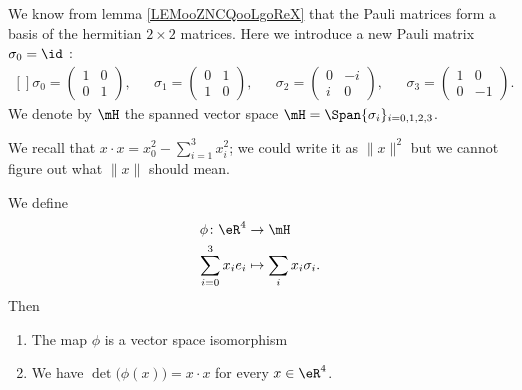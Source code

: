 We know from lemma \ref{LEMooZNCQooLgoReX} that the Pauli matrices form a basis of the hermitian \( 2\times 2\) matrices. Here we introduce a new Pauli matrix \( \sigma_0=\id\) :
\begin{equation}
	\begin{aligned}[]
		\sigma_0=\begin{pmatrix}
			         1 & 0 \\
			         0 & 1
		         \end{pmatrix}, &  &
		\sigma_1=\begin{pmatrix}
			         0 & 1 \\
			         1 & 0
		         \end{pmatrix}, &  &
		\sigma_2=\begin{pmatrix}
			         0 & -i \\
			         i & 0
		         \end{pmatrix}, &  &
		\sigma_3=\begin{pmatrix}
			         1 & 0  \\
			         0 & -1
		         \end{pmatrix}.
	\end{aligned}
\end{equation}
We denote by \( \mH\) the spanned vector space \( \mH=\Span\{ \sigma_i \}_{i=0,1,2,3}\).

\begin{normaltext}
	We recall that \( x\cdot x=x_0^2-\sum_{i=1}^3x_i^2\); we could write it as \( \| x \|^2\) but we cannot figure out what \( \| x \| \) should mean.
\end{normaltext}

\begin{lemma}       \label{LEMooXKHYooFTzHhg}
	We define
	\begin{equation}
		\begin{aligned}
			\phi\colon \eR^4   & \to \mH                    \\
			\sum_{i=0}^3x_ie_i & \mapsto \sum_ix_i\sigma_i.
		\end{aligned}
	\end{equation}
	Then
	\begin{enumerate}
		\item
		      The map \( \phi\) is a vector space isomorphism
		\item       \label{ITEMooISFKooItVpre}
		      We have \( \det\big( \phi(x) \big)=x\cdot x\) for every \( x\in \eR^4\).
	\end{enumerate}
\end{lemma}

